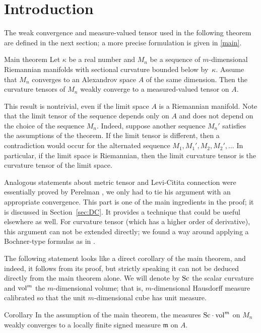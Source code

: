 \section{Introduction}

The weak convergence and measure-valued tensor used in the following theorem are defined in the next section;
a more precise formulation is given in \ref{main}.

\begin{thm}{Main theorem}
Let $\kappa$ be a real number and 
$M_n$ be a sequence of $m$-dimensional Riemannian manifolds with sectional curvature bounded below by~$\kappa$.
Assume that $M_n$ converges to an Alexandrov space $A$ of the same dimension.
Then the curvature tensors of $M_n$ weakly converge to a measured-valued tensor on $A$.
\end{thm}

This result is nontrivial, even if the limit space $A$ is a Riemannian manifold.
Note that the limit tensor of the sequence depends only on $A$ and does not depend on the choice of the sequence $M_n$.
Indeed, suppose another sequence $M_n'$ satisfies the assumptions of the theorem.
If the limit tensor is different, 
then a contradiction would occur for the alternated sequence $M_1,M_1',M_2,M_2',\dots$ 
In particular, if the limit space is Riemannian, then the limit curvature tensor is the curvature tensor of the limit space.

Analogous statements about metric tensor and Levi-Citita connection were essentially proved by Perelman \cite{PerDC},
we only had to tie his argument with an appropriate convergence.
This part is one of the main ingredients in the proof;
it is discussed in Section~\ref{sec:DC}. 
It provides a technique that could be useful elsewhere as well.
For curvature tensor (which has a higher order of derivative), this argument can not be extended directly;
we found a way around applying a Bochner-type formulas as in \cite{petrunin-SC}.

The following statement looks like a direct corollary of the main theorem, 
and indeed, it follows from its proof, but strictly speaking it can not be deduced directly from the main theorem alone.
We will denote by $\operatorname{\rm Sc}$ the scalar curvature and $\operatorname{vol}^m$ the $m$-dimensional volume; that is, $m$-dimensional Hausdorff measure calibrated so that the unit $m$-dimensional cube has unit measure.

\begin{thm}{Corollary}\label{cor:Sc}
In the assumption of the main theorem,
the measures $\Sc\cdot \vol^m$ on $M_n$ weakly converges to a locally finite signed measure $\mathfrak m$  on $A$.
\end{thm}

